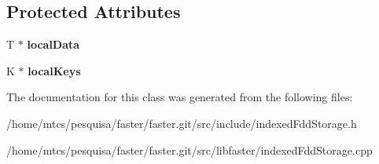 \subsection*{Protected Attributes}
\begin{DoxyCompactItemize}
\item 
\hypertarget{classfaster_1_1indexedFddStorageCore_afc155f998bfe42973147af89bf75cfa5}{}T $\ast$ {\bfseries local\+Data}\label{classfaster_1_1indexedFddStorageCore_afc155f998bfe42973147af89bf75cfa5}

\item 
\hypertarget{classfaster_1_1indexedFddStorageCore_a4a31c9b81ef61a2aca489bdc010566f9}{}K $\ast$ {\bfseries local\+Keys}\label{classfaster_1_1indexedFddStorageCore_a4a31c9b81ef61a2aca489bdc010566f9}

\end{DoxyCompactItemize}


The documentation for this class was generated from the following files\+:\begin{DoxyCompactItemize}
\item 
/home/mtcs/pesquisa/faster/faster.\+git/src/include/indexed\+Fdd\+Storage.\+h\item 
/home/mtcs/pesquisa/faster/faster.\+git/src/libfaster/indexed\+Fdd\+Storage.\+cpp\end{DoxyCompactItemize}
